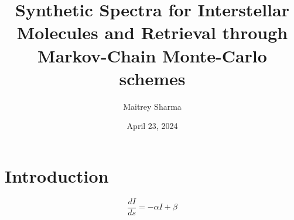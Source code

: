 \documentclass{article}
\title{\textbf{Synthetic Spectra for Interstellar 
Molecules and Retrieval through Markov-Chain Monte-Carlo
schemes}}
\author{Maitrey Sharma}
\date{April 23, 2024}
\begin{document}
\maketitle

\section{Introduction}
\begin{equation}
    \frac{dI}{ds} = -\alpha I + \beta
\end{equation}
\section{}
\end{document}

